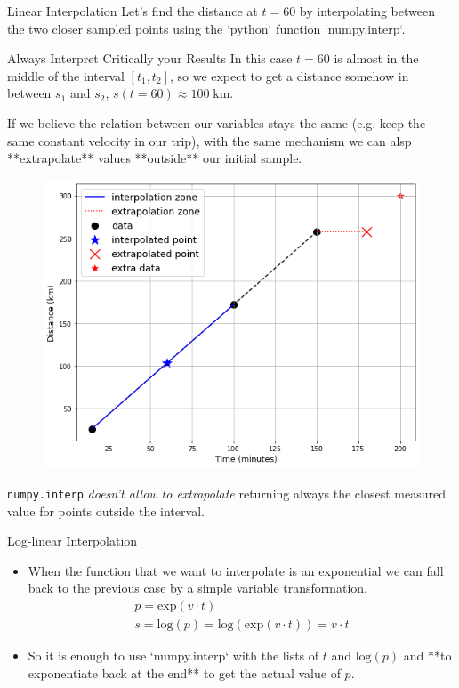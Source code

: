 \documentclass{beamer}
\begin{document}
\begin{frame}{Linear Interpolation}
  Let's find the distance at $t = 60$ by interpolating between the two closer sampled points using the `python` function `numpy.interp`.
%
%
  \begin{block}{Always Interpret Critically your Results}
    In this case $t=60$ is almost in the middle of the interval $[t_1, t_2]$, so we expect to get a distance somehow in between $s_1$ and $s_2$, $s(t=60) \approx 100\;\textrm{km}$.
  \end{block}
  If we believe the relation between our variables stays the same (e.g. keep the same constant velocity in our trip), with the same mechanism we can alsp **extrapolate** values **outside** our initial sample.
  \begin{figure}[h]
    \begin{center}
      \includegraphics[width=0.55\linewidth]{interp2}
    \end{center}
  \end{figure}
  \texttt{numpy.interp} \emph{doesn't allow to extrapolate} returning always the closest measured value for points outside the interval.
\end{frame}

\begin{frame}{Log-linear Interpolation}
  \begin{itemize}
    \item When the function that we want to interpolate is an exponential we can fall back to the previous case by a simple variable transformation. 
      \begin{equation}
        \begin{gathered}
          p = \mathrm{exp}(v \cdot t) \\
          s = \mathrm{log}(p) = \mathrm{log}(\mathrm{exp}(v \cdot t)) = v \cdot t
        \end{gathered}
      \end{equation}

    \item So it is enough to use `numpy.interp` with the lists of $t$ and $\mathrm{log}(p)$ and **to exponentiate back at the end** to get the actual value of $p$.
  \end{itemize}
\end{frame}
\end{document}
